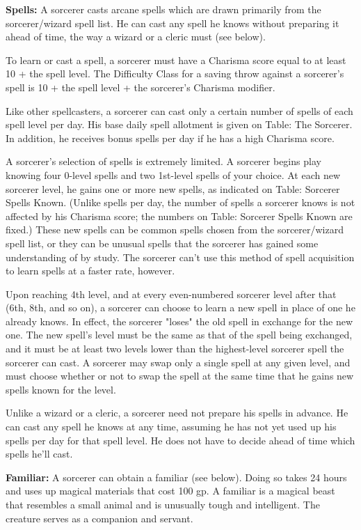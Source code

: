 \textbf{Spells:} A sorcerer casts arcane spells which are drawn primarily from 
the sorcerer/wizard spell list. He can cast any spell he knows without preparing 
it ahead of time, the way a wizard or a cleric must (see below).

To learn or cast a spell, a sorcerer must have a Charisma score equal to at least 
10 + the spell level. The Difficulty Class for a saving throw against a sorcerer's 
spell is 10 + the spell level + the sorcerer's Charisma modifier.

Like other spellcasters, a sorcerer can cast only a certain number of spells of 
each spell level per day. His base daily spell allotment is given on Table: The 
Sorcerer. In addition, he receives bonus spells per day if he has a high Charisma 
score.

A sorcerer's selection of spells is extremely limited. A sorcerer begins play knowing 
four 0-level spells and two 1st-level spells of your choice. At each new sorcerer 
level, he gains one or more new spells, as indicated on Table: Sorcerer Spells 
Known. (Unlike spells per day, the number of spells a sorcerer knows is not affected 
by his Charisma score; the numbers on Table: Sorcerer Spells Known are fixed.) 
These new spells can be common spells chosen from the sorcerer/wizard spell list, 
or they can be unusual spells that the sorcerer has gained some understanding of 
by study. The sorcerer can't use this method of spell acquisition to learn spells 
at a faster rate, however.

Upon reaching 4th level, and at every even-numbered sorcerer level after that (6th, 
8th, and so on), a sorcerer can choose to learn a new spell in place of one he 
already knows. In effect, the sorcerer "loses" the old spell in exchange for 
the new one. The new spell's level must be the same as that of the spell being 
exchanged, and it must be at least two levels lower than the highest-level sorcerer 
spell the sorcerer can cast. A sorcerer may swap only a single spell at any given 
level, and must choose whether or not to swap the spell at the same time that he 
gains new spells known for the level.

Unlike a wizard or a cleric, a sorcerer need not prepare his spells in advance. 
He can cast any spell he knows at any time, assuming he has not yet used up his 
spells per day for that spell level. He does not have to decide ahead of time which 
spells he'll cast.

\textbf{Familiar:} A sorcerer can obtain a familiar (see below). Doing so takes 
24 hours and uses up magical materials that cost 100 gp. A familiar is a magical 
beast that resembles a small animal and is unusually tough and intelligent. The 
creature serves as a companion and servant.

